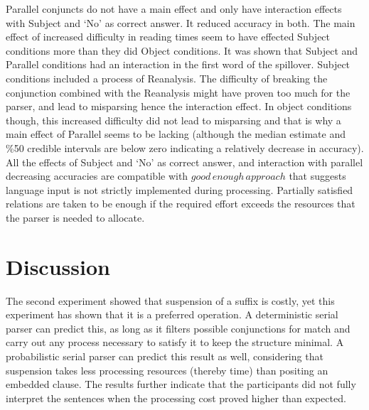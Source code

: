 Parallel conjuncts do not have a main effect and only have interaction effects with Subject and `No' as correct answer. It reduced accuracy in both. The main effect of increased difficulty in reading times seem to have effected Subject conditions more than they did Object conditions. It was shown that Subject and Parallel conditions had an interaction in the first word of the spillover. Subject conditions included a process of Reanalysis. The difficulty of breaking the conjunction combined with the Reanalysis might have proven too much for the parser, and lead to misparsing hence the interaction effect. In object conditions though, this increased difficulty did not lead to misparsing and that is why a main effect of Parallel seems to be lacking (although the median estimate and \%50 credible intervals are below zero indicating a relatively decrease in accuracy). All the effects of Subject and `No' as correct answer, and interaction with parallel decreasing accuracies are compatible with $good\,enough\,approach$ \citep{ferreira2001misinterpretations,ferreira2007good} that suggests language input is not strictly implemented during processing. Partially satisfied relations are taken to be enough if the required effort exceeds the resources that the parser is needed to allocate. 



\section{Discussion}

The second experiment showed that suspension of a suffix is costly, yet this experiment has shown that it is a preferred operation. A deterministic serial parser can predict this, as long as it filters possible conjunctions for {\Case} match and carry out any process necessary to satisfy it to keep the structure minimal. A probabilistic serial parser can predict this result as well, considering that suspension takes less processing resources (thereby time) than positing an embedded clause. The results further indicate that the participants did not fully interpret the sentences when the processing cost proved higher than expected.

